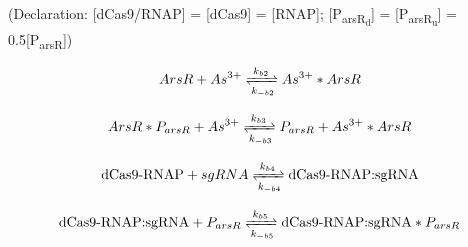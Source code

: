 (Declaration: [dCas9/RNAP] = [dCas9] = [RNAP]; [P\textsubscript{arsR\textsubscript{d}}] = [P\textsubscript{arsR\textsubscript{u}}] = 0.5{[P\textsubscript{arsR}]})

\begin{equation}
	ArsR +As^{3+}\xrightleftharpoons[k_{-b2}]{k_{b2}}As^{3+}*ArsR
\end{equation}

\begin{equation}
	ArsR*P_{arsR} +As^{3+}\xrightleftharpoons[k_{-b3}]{k_{b3}}P_{arsR}+ As^{3+}*ArsR
\end{equation}

\begin{equation}
	\text{dCas9-RNAP}+sgRNA\xrightleftharpoons[k_{-b4}]{k_{b4}} \text{dCas9-RNAP:sgRNA}
\end{equation}

\begin{equation}
	\text{dCas9-RNAP:sgRNA}+P_{arsR}\xrightleftharpoons[k_{-b5}]{k_{b5}} \text{dCas9-RNAP:sgRNA}*P_{arsR}
\end{equation}

